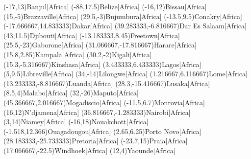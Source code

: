 \mapput[0](-17,13){Banjul}[Africa] %
\mapput[90](-88,17.5){Belize}[Africa] %
\mapput[180](-16,12){Bissau}[Africa] %
\mapput[90](15,-5){Brazzaville}[Africa] %
\mapput[90](29.5,-3){Bujumbura}[Africa] %
\mapput[180](-13.5,9.5){Conakry}[Africa] %
\mapput[90](-17.666667,14.833333){Dakar}[Africa] %
\mapput[90](39.283333,-6.816667){Dar Es Salaam}[Africa] %
\mapput[90](43,11.5){Djibouti}[Africa] %
\mapput[180](-13.183333,8.45){Freetown}[Africa] %
\mapput[90](25.5,-23){Gaborone}[Africa] %
\mapput[90](31.066667,-17.816667){Harare}[Africa] %
\mapput[90](15.8,2.85){Kampala}[Africa] %
\mapput[90](30.2,-2){Kigali}[Africa] %
\mapput[0](15.3,-5.316667){Kinshasa}[Africa] %
\mapput[90](3.433333,6.433333){Lagos}[Africa] %
\mapput[90](5,9.5){Libreville}[Africa] %
\mapput[90](34,-14){Lilongwe}[Africa] %
\mapput[90](1.216667,6.116667){Lome}[Africa] %
\mapput[90](13.233333,-8.816667){Luanda}[Africa] %
\mapput[90](28.3,-15.416667){Lusaka}[Africa] %
\mapput[180](8.5,4){Malabo}[Africa] %
\mapput[0](32,-26){Maputo}[Africa] %
\mapput[90](45.366667,2.016667){Mogadiscio}[Africa] %
\mapput[180](-11.5,6.7){Monrovia}[Africa] %
\mapput[90](16,12){N'djamena}[Africa] %
\mapput[90](36.816667,-1.283333){Nairobi}[Africa] %
\mapput[90](3,14){Niamey}[Africa] %
\mapput[90](-16,18){Nouakchott}[Africa] %
\mapput[90](-1.518,12.366){Ouagadougou}[Africa] %
\mapput[-90](2.65,6.25){Porto Novo}[Africa] %
\mapput[90](28.183333,-25.733333){Pretoria}[Africa] %
\mapput[180](-23.7,15){Praia}[Africa] %
\mapput[90](17.066667,-22.5){Windhoek}[Africa] %
\mapput[90](12,4){Yaounde}[Africa] %





